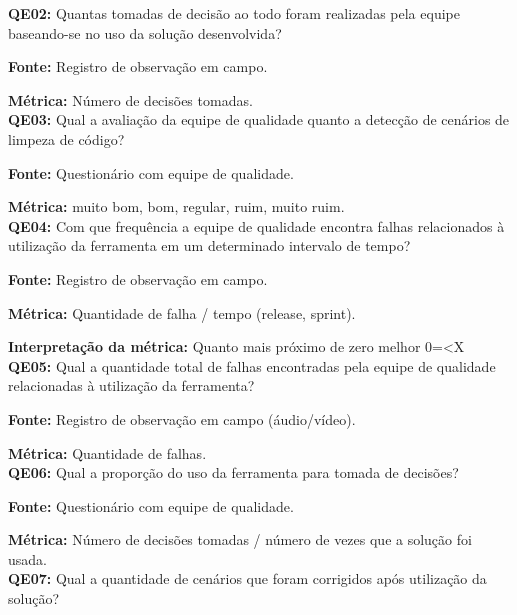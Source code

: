 
\textbf{QE02: } Quantas tomadas de decisão ao todo foram realizadas pela equipe baseando-se no uso da solução desenvolvida?

\textbf{Fonte:} Registro de observação em campo.

\textbf{Métrica:} Número de decisões tomadas.\\



\textbf{QE03: } Qual a avaliação da equipe de qualidade quanto a detecção de cenários de limpeza de código?

\textbf{Fonte:} Questionário com equipe de qualidade.

\textbf{Métrica:} muito bom, bom, regular, ruim, muito ruim.\\



\textbf{QE04: } Com que frequência a equipe de qualidade encontra falhas relacionados à utilização da ferramenta em um determinado intervalo de tempo?

\textbf{Fonte:} Registro de observação em campo.

\textbf{Métrica:} Quantidade de falha / tempo (release, sprint).

\textbf{Interpretação da métrica:} Quanto mais próximo de zero melhor 0=<X\\



\textbf{QE05: } Qual a quantidade total de falhas encontradas pela equipe de qualidade relacionadas à utilização da ferramenta?

\textbf{Fonte:} Registro de observação em campo (áudio/vídeo).

\textbf{Métrica:} Quantidade de falhas.\\



\textbf{QE06: } Qual a proporção do uso da ferramenta para tomada de decisões?

\textbf{Fonte:} Questionário com equipe de qualidade.

\textbf{Métrica:} Número de decisões tomadas / número de vezes que a solução foi usada.\\




\textbf{QE07: } Qual a quantidade de cenários que foram corrigidos após utilização da solução?

